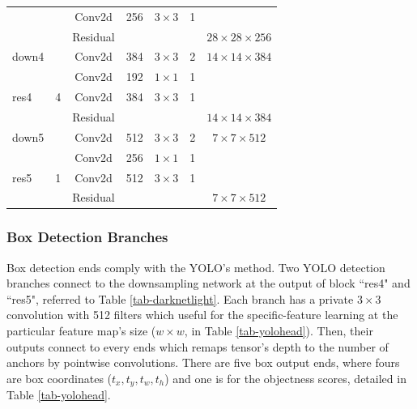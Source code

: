 \documentclass[default,pdflatex,iicol]{sn-jnl}%
\begin{document}
\begin{table}[]
{\begin{tabular}{@{}lcccccc@{}}
                      	&                    & Conv2d                  		& 256 	& $3\times3$    	& 1 	&    \\
                      	&                    & Residual             			&     		&        				&   	& $28\times28\times256$   \\ \midrule
down4                &                    & Conv2d                  		& 384 	& $3\times3$    	& 2 	& $14\times14\times384$   \\ \midrule
\multirow{3}{*}{res4} & \multirow{3}{*}{4} & Conv2d            & 192 	& $1\times1$    	& 1 	&             \\
                      	&                    & Conv2d                  		& 384 	& $3\times3$    	& 1 	&    \\
                      	&                    & Residual             			&     		&        				&   	& $14\times14\times384$   \\ \midrule
down5               	&                    & Conv2d                  		& 512 	& $3\times3$    	& 2 	& $7\times7\times512$     \\ \midrule
\multirow{3}{*}{res5} & \multirow{3}{*}{1} & Conv2d            & 256 	& $1\times1$    	& 1 	&             \\
                      	&                    & Conv2d                  		& 512 	& $3\times3$    	& 1 	&      \\
                      	&                    & Residual             			&     		&        				&   	& $7\times7\times512$     \\ \bottomrule
\end{tabular}%
}
\end{table}

\subsubsection{Box Detection Branches}
Box detection ends comply with the YOLO's method. Two YOLO detection branches connect to the downsampling network at the output of block ``res4" and ``res5", referred to Table \ref{tab-darknetlight}. Each branch has a private $3\times3$ convolution with 512 filters which useful for the specific-feature learning at the particular feature map's size ($w \times w$, in Table \ref{tab-yolohead}). Then, their outputs connect to every ends which remaps tensor's depth to the number of anchors by pointwise convolutions. There are five box output ends, where fours are box coordinates ($t_x, t_y, t_w, t_h$) and one is for the objectness scores, detailed in Table \ref{tab-yolohead}. 
\end{document}
